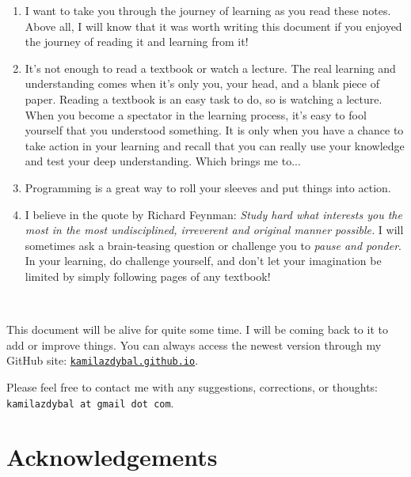 \documentclass[12pt]{report}
\begin{document}
\begin{enumerate}
\item I want to take you through the journey of learning as you read these notes. Above all, I will know that it was worth writing this document if you enjoyed the journey of reading it and learning from it!

\item It's not enough to read a textbook or watch a lecture. The real learning and understanding comes when it's only you, your head, and a blank piece of paper. Reading a textbook is an easy task to do, so is watching a lecture. When you become a spectator in the learning process, it's easy to fool yourself that you understood something. It is only when you have a chance to take action in your learning and recall that you can really use your knowledge and test your deep understanding. Which brings me to...

\item Programming is a great way to roll your sleeves and put things into action.

\item I believe in the quote by Richard Feynman: \textit{Study hard what interests you the most in the most undisciplined, irreverent and original manner possible.} I will sometimes ask a brain-teasing question or challenge you to \textit{pause and ponder}. In your learning, do challenge yourself, and don't let your imagination be limited by simply following pages of any textbook!
\end{enumerate}

\,\,

This document will be alive for quite some time. I will be coming back to it to add or improve things. You can always access the newest version through my GitHub site: \href{https://kamilazdybal.github.io/}{\texttt{kamilazdybal.github.io}}.

Please feel free to contact me with any suggestions, corrections, or thoughts: \verb|kamilazdybal at gmail dot com|.

\newpage
\thispagestyle{empty}
\tableofcontents


\newpage
\chapter*{Acknowledgements}
\thispagestyle{empty}

{\fontsize{12}{12}}
\end{document}
